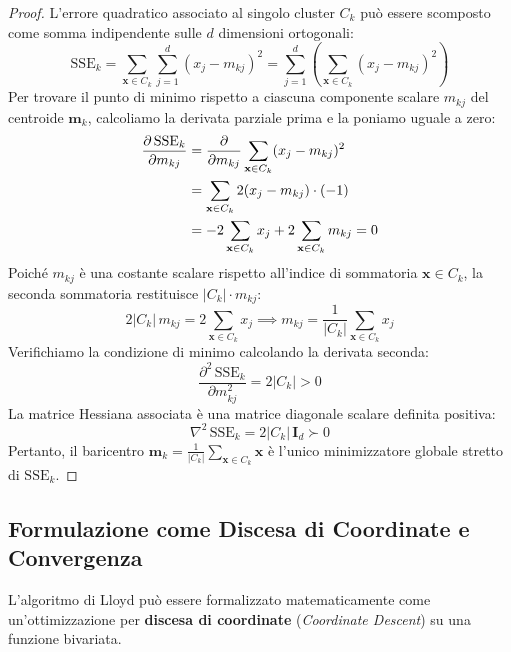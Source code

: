 \begin{proof}
L'errore quadratico associato al singolo cluster $C_k$ può essere scomposto come somma indipendente sulle $d$ dimensioni ortogonali:
\begin{equation}
    \mathrm{SSE}_k = \sum_{\mathbf{x} \in C_k} \sum_{j=1}^d (x_j - m_{kj})^2 = \sum_{j=1}^d \left( \sum_{\mathbf{x} \in C_k} (x_j - m_{kj})^2 \right)
\end{equation}
Per trovare il punto di minimo rispetto a ciascuna componente scalare $m_{kj}$ del centroide $\mathbf{m}_k$, calcoliamo la derivata parziale prima e la poniamo uguale a zero:
\begin{align}
    \frac{\partial \, \mathrm{SSE}_k}{\partial m_{kj}} &= \frac{\partial}{\partial m_{kj}} \sum_{\mathbf{x} \in C_k} (x_j - m_{kj})^2 \notag \\
    &= \sum_{\mathbf{x} \in C_k} 2 (x_j - m_{kj}) \cdot (-1) \notag \\
    &= -2 \sum_{\mathbf{x} \in C_k} x_j + 2 \sum_{\mathbf{x} \in C_k} m_{kj} = 0
\end{align}
Poiché $m_{kj}$ è una costante scalare rispetto all'indice di sommatoria $\mathbf{x} \in C_k$, la seconda sommatoria restituisce $|C_k| \cdot m_{kj}$:
\begin{equation}
    2 |C_k| \, m_{kj} = 2 \sum_{\mathbf{x} \in C_k} x_j \implies m_{kj} = \frac{1}{|C_k|} \sum_{\mathbf{x} \in C_k} x_j
\end{equation}
Verifichiamo la condizione di minimo calcolando la derivata seconda:
\begin{equation}
    \frac{\partial^2 \, \mathrm{SSE}_k}{\partial m_{kj}^2} = 2 |C_k| > 0
\end{equation}
La matrice Hessiana associata è una matrice diagonale scalare definita positiva:
\begin{equation}
    \nabla^2 \, \mathrm{SSE}_k = 2 |C_k| \, \mathbf{I}_d \succ 0
\end{equation}
Pertanto, il baricentro $\mathbf{m}_k = \frac{1}{|C_k|} \sum_{\mathbf{x} \in C_k} \mathbf{x}$ è l'unico minimizzatore globale stretto di $\mathrm{SSE}_k$.
\end{proof}

\FloatBarrier
\subsection{Formulazione come Discesa di Coordinate e Convergenza}

L'algoritmo di Lloyd può essere formalizzato matematicamente come un'ottimizzazione per \textbf{discesa di coordinate} (\textit{Coordinate Descent}) su una funzione bivariata.

